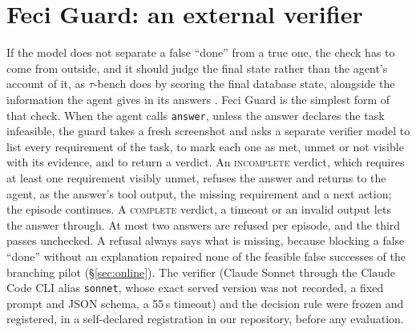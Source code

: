 \section{Feci Guard: an external verifier}
\label{sec:guard}
If the model does not separate a false ``done'' from a true one, the check has to come from outside, and it should judge the final state rather than the agent's account of it, as $\tau$-bench does by scoring the final database state, alongside the information the agent gives in its answers \citep{yao2024taubench}. Feci Guard is the simplest form of that check. When the agent calls \texttt{answer}, unless the answer declares the task infeasible, the guard takes a fresh screenshot and asks a separate verifier model to list every requirement of the task, to mark each one as met, unmet or not visible with its evidence, and to return a verdict. An \textsc{incomplete} verdict, which requires at least one requirement visibly unmet, refuses the answer and returns to the agent, as the answer's tool output, the missing requirement and a next action; the episode continues. A \textsc{complete} verdict, a timeout or an invalid output lets the answer through. At most two answers are refused per episode, and the third passes unchecked. A refusal always says what is missing, because blocking a false ``done'' without an explanation repaired none of the feasible false successes of the branching pilot (\S\ref{sec:online}). The verifier (Claude Sonnet through the Claude Code CLI alias \texttt{sonnet}, whose exact served version was not recorded, a fixed prompt and JSON schema, a 55\,s timeout) and the decision rule were frozen and registered, in a self-declared registration in our repository, before any evaluation. %

